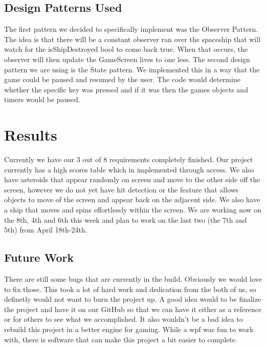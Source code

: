 \documentclass[10pt,conference,onecolumn,compsoc]{IEEEtran}
\begin{document}
\subsection{Design Patterns Used}
The first pattern we decided to specifically implement was the Observer Pattern. The idea is that there will be a constant observer ran over the spaceship that will watch for the isShipDestroyed bool to come back true.  When that occurs,  the observer will then update the GameScreen lives to one less. 
The second design pattern we are using is the State pattern. We implemented this in a way that the game could be paused and resumed by the user. The code would determine whether the specific key was pressed and if it was then the games objects and timers would be paused. 


\section{Results}
Currently we have our 3 out of 8 requirements completely finished. Our project currently has a high scores table which in implemented through access. We also have asteroids that appear randomly on screen and move to the other side off the screen, however we do not yet have hit detection or the feature that allows objects to move of the screen and appear back on the adjacent side. We also have a ship that moves and spins effortlessly within the screen. We are working now on the 8th, 4th and 6th this week and plan to work on the last two (the 7th and 5th) from April 18th-24th.

\subsection{Future Work}
There are still some bugs that are currently in the build. Obviously we would love to fix those. This took a lot of hard work and dedication from the both of us, so definetly would not want to burn the project up. A good idea would to be finalize the project and have it on our GitHub so that we can have it either as a reference or for others to see what we accomplished. It also wouldn't be a bad idea to rebuild this project in a better engine for gaming. While a wpf was fun to work with, there is software that can make this project a bit easier to complete.



\end{document}
